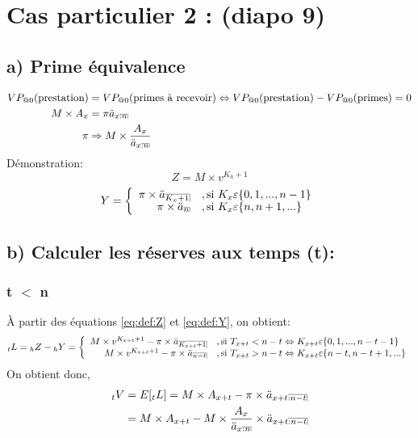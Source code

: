 \documentclass[11pt,french]{report}
\makeatletter
\DeclareRobustCommand{\annuity}[1]{%
\def\arraystretch{0}%
\setlength\arraycolsep{.7pt}%
\setlength\arrayrulewidth{.3pt}%
\begin{array}[b]{@{}c|}\hline
\\[\arraycolsep]%
\scriptstyle #1%
\end{array}%
}
\newcommand{\indiceGauche}[2]{{\vphantom{#2}}_{#1}#2}
\makeatother
\begin{document}
\section{Cas particulier 2 : (diapo 9)}
\label{sec:cas:2}

\subsection*{a) Prime équivalence}

\begin{align*}
VP_{@0}(\text{prestation}) &= VP_{@0} (\text{primes à recevoir}) \Leftrightarrow VP_{@0} (\text{prestation}) - VP_{@0} (\text{primes}) = 0 \\
M \times A_{x} &= \pi \ddot{a}_{x\annuity{:n}} \\
\pi &\Rightarrow  M \times \frac{A_{x}}{\ddot{a}_{x\annuity{:n}}}
\end{align*}
Démonstration:
\begin{equation}
\label{eq:def:Z}
Z = M \times v^{K_{n}+1}
\end{equation}
\begin{equation}
\label{eq:def:Y}
	Y =
     \left\{
     \begin{array}{rl}
     \pi \times\ddot{a}_{\annuity{K_{x}+1}}  &, \text{si } K_{x} \varepsilon \lbrace0,1,...,n-1\rbrace\\
      \pi \times \ddot{a}_{\annuity{n}} &, \text{si } K_{x} \varepsilon \lbrace n,n+1,...\rbrace
     \end{array}
     \right.
\end{equation}
\subsection*{b) Calculer les réserves aux temps (t):}

\subsubsection*{t $<$ n}
À partir des équations \ref{eq:def:Z} et \ref{eq:def:Y}, on obtient:
\begin{equation*}
     \indiceGauche{t}{L} = \indiceGauche{h}{Z} - \indiceGauche{h}{Y} = 
     \left\{
     \begin{array}{rl}
     M \times v^{K_{x+t}+1} - \pi \times \ddot{a}_{\annuity{K_{x+t}+1}}  &, \text{si } T_{x+t} < n -t \Leftrightarrow K_{x+t} \varepsilon \lbrace0,1,...,n-t-1\rbrace\\
       M \times v^{K_{x+t}+1} - \pi \times \ddot{a}_{\annuity{n - t}} &, \text{si }  T_{x+t} > n -t \Leftrightarrow K_{x+t} \varepsilon \lbrace n-t,n-t+1,...\rbrace
     \end{array}
     \right.
\end{equation*}
On obtient donc,
\begin{align*}
\indiceGauche{t}{V} &= E[\indiceGauche{t}{L}] = M \times A_{x + t} - \pi \times \ddot{a}_{x+t\annuity{:n-t}}\\
&= M \times A_{x + t} -  M \times \frac{A_{x}}{\ddot{a}_{x\annuity{:n}}} \times \ddot{a}_{x+t\annuity{:n-t}}
\end{align*}
\end{document}
